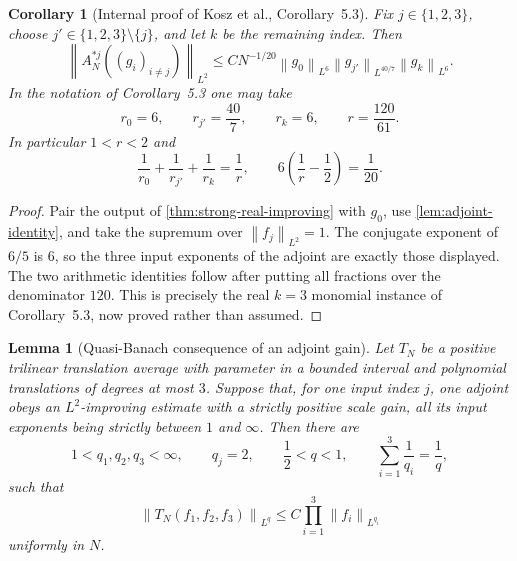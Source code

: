 \documentclass[11pt]{article}
\newtheorem{lemma}[theorem]{Lemma}
\newtheorem{corollary}[theorem]{Corollary}
\newcommand{\norm}[2]{\left\lVert #1\right\rVert_{#2}}
\newcommand{\indices}{\{1,2,3\}}
\begin{document}
	\begin{corollary}[Internal proof of Kosz et al., Corollary~5.3]\label{cor:kosz-53-internal}
		Fix \(j\in\indices\), choose \(j'\in\indices\setminus\{j\}\), and let \(k\) be the remaining index.  Then
		\[
		\norm{A_N^{*j}((g_i)_{i\neq j})}{L^2}
		\leq
		CN^{-1/20}
		\norm{g_0}{L^6}
		\norm{g_{j'}}{L^{40/7}}
		\norm{g_k}{L^6}.
		\]
		In the notation of Corollary~5.3 one may take
		\[
		r_0=6,\qquad r_{j'}=\frac{40}{7},\qquad r_k=6,
		\qquad r=\frac{120}{61}.
		\]
		In particular \(1<r<2\) and
		\[
		\frac1{r_0}+\frac1{r_{j'}}+\frac1{r_k}
		=\frac1r,\qquad
		6\left(\frac1r-\frac12\right)=\frac1{20}.
		\]
	\end{corollary}
	
	\begin{proof}
		Pair the output of \cref{thm:strong-real-improving} with \(g_0\), use
		\cref{lem:adjoint-identity}, and take the supremum over
		\(\norm{f_j}{L^2}=1\).  The conjugate exponent of \(6/5\) is \(6\), so the three input exponents of the adjoint are exactly those displayed.  The two arithmetic identities follow after putting all fractions over the denominator \(120\).  This is precisely the real \(k=3\) monomial instance of Corollary~5.3, now proved rather than assumed.
	\end{proof}
	
	\begin{lemma}[Quasi-Banach consequence of an adjoint gain]\label{lem:adjoint-gain-to-subunit}
		Let \(T_N\) be a positive trilinear translation average with parameter in a bounded interval and polynomial translations of degrees at most \(3\).  Suppose that, for one input index \(j\), one adjoint obeys an \(L^2\)-improving estimate with a strictly positive scale gain, all its input exponents being strictly between \(1\) and \(\infty\).  Then there are
		\[
		1<q_1,q_2,q_3<\infty,\qquad q_j=2,\qquad \frac12<q<1,
		\qquad \sum_{i=1}^3\frac1{q_i}=\frac1q,
		\]
		such that
		\[
		\norm{T_N(f_1,f_2,f_3)}{L^q}
		\leq C\prod_{i=1}^3\norm{f_i}{L^{q_i}}
		\]
		uniformly in \(N\).
	\end{lemma}
	
\end{document}
